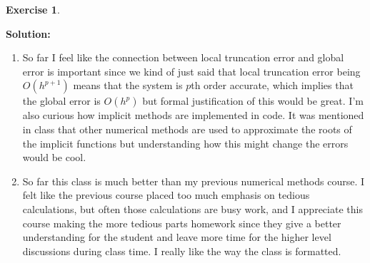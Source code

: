 \documentclass[a4paper,12pt]{scrartcl} %
\newenvironment{solution}
  {\par\color{answercolor}\textbf{Solution:}\ }
  {\par}
\newcounter{customcounter}
\theoremstyle{darktheorem}
\newtheorem{exercise}[customcounter]{Exercise}
\begin{document}
\begin{exercise}
    
\end{exercise}
\begin{solution}
   \begin{enumerate}
       \item So far I feel like the connection between local truncation error and global error is important since we kind of just said that local truncation error
           being $O(h^{p+1})$ means that the system is $p$th order accurate, which implies that the global error is $O(h^{p})$ but formal justification of this would be great.
           I'm also curious how implicit methods are implemented in code. It was mentioned in class that other numerical methods are used to approximate the roots of the implicit functions
           but understanding how this might change the errors would be cool.
       \item So far this class is much better than my previous numerical methods course. I felt like the previous course placed too much emphasis on tedious calculations, but often those calculations are busy work, and I appreciate
           this course making the more tedious parts homework since they give a better understanding for the student and leave more time for the higher level discussions during class time. I really like the way the class is formatted.
   \end{enumerate} 
\end{solution}
\end{document}
